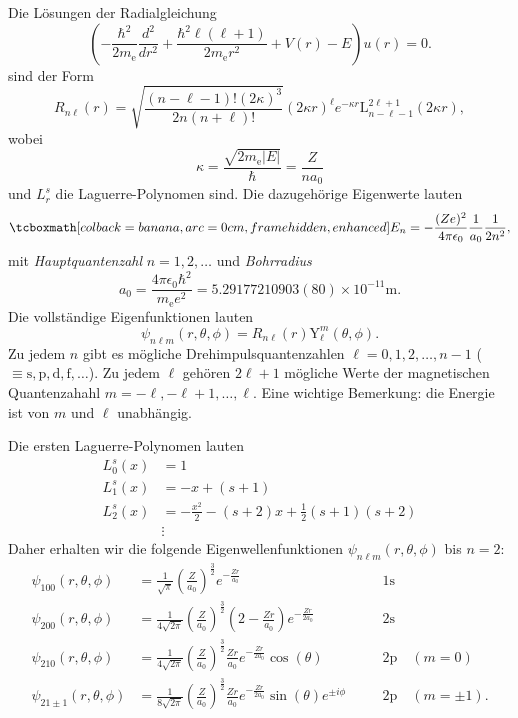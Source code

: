 Die Lösungen der Radialgleichung 
\begin{equation}
	\left(-\frac{\hbar^2}{2m_{\text{e}}}\frac{d^2}{dr^2} + \frac{\hbar^2\ell(\ell+1)}{2m_{\text{e}}r^2} + V(r) - E\right)u(r) = 0.
\end{equation}
sind der Form
\begin{equation}
	R_{n\ell}(r) = \sqrt{\frac{(n-\ell-1)!(2\kappa)^3}{2n(n+\ell)!}}(2\kappa r)^\ell e^{-\kappa r}\text{L}_{n-\ell-1}^{2\ell +1}(2\kappa r),	
\end{equation}
wobei 
\begin{equation}
	\kappa = \frac{\sqrt{2m_{\text{e}}|E|}}{\hbar} = \frac{Z}{n a_0}
\end{equation}
und $L_r^s$ die Laguerre-Polynomen sind. Die dazugehörige Eigenwerte lauten
\begin{equation}
	\eqbox{E_n = -\frac{(Ze)^2}{4\pi\epsilon_0}\frac{1}{a_0}\frac{1}{2n^2},}
\end{equation}
mit \emph{Hauptquantenzahl} $n=1,2,\ldots$ und \emph{Bohrradius} 
\begin{equation}
	a_0 = \frac{4\pi\epsilon_0\hbar^2}{m_{\text{e}}e^2} = 5.29177210903(80) \times 10^{−11} \text{m}.
\end{equation}
Die vollständige Eigenfunktionen lauten
\begin{equation}
	\psi_{n\ell m}(r,\theta,\phi) = R_{n\ell}(r)\text{Y}_{\ell}^m(\theta,\phi).
\end{equation}
Zu jedem $n$ gibt es mögliche Drehimpulsquantenzahlen $\ell = 0,1,2, \ldots, n-1$ ($\equiv \text{s}, \text{p}, \text{d}, \text{f}, \ldots $). Zu jedem $\ell$ gehören $2\ell +1$ mögliche Werte der magnetischen Quantenzahahl $m = -\ell, -\ell+1, \ldots, \ell$. Eine wichtige Bemerkung: die Energie ist von $m$ und $\ell$ unabhängig. 

Die ersten Laguerre-Polynomen lauten
\begin{equation}
	\begin{split}
		L_0^s(x) &= 1 \\
		L_1^s(x) &= -x+(s+1) \\
		L_2^s(x) &= -\frac{x^2}{2}-(s+2)x + \frac{1}{2}(s+1)(s+2) \\
		&\vdots
	\end{split}
\end{equation}
Daher erhalten wir die folgende Eigenwellenfunktionen $\psi_{n\ell m}(r,\theta,\phi)$ bis $n=2$:
\begin{align*}
	\psi_{100}(r,\theta,\phi) &= \frac{1}{\sqrt{\pi}}\left(\frac{Z}{a_0}\right)^{\frac{3}{2}}e^{-\frac{Zr}{a_0}} &\quad & 1\text{s} \\
	\psi_{200}(r,\theta,\phi) &= \frac{1}{4\sqrt{2\pi}}\left(\frac{Z}{a_0}\right)^{\frac{3}{2}}\left(2-\frac{Zr}{a_0}\right)e^{-\frac{Zr}{2a_0}} &\quad & 2\text{s} \\
	\psi_{210}(r,\theta,\phi) &= \frac{1}{4\sqrt{2\pi}}\left(\frac{Z}{a_0}\right)^{\frac{3}{2}}\frac{Zr}{a_0}e^{-\frac{Zr}{2a_0}}\cos(\theta) &\quad & 2\text{p} \quad (m=0) \\
	\psi_{21\pm1}(r,\theta,\phi) &= \frac{1}{8\sqrt{2\pi}}\left(\frac{Z}{a_0}\right)^{\frac{3}{2}}\frac{Zr}{a_0}e^{-\frac{Zr}{2a_0}}\sin(\theta)e^{\pm i\phi} &\quad & 2\text{p} \quad (m=\pm1). \\
\end{align*}
